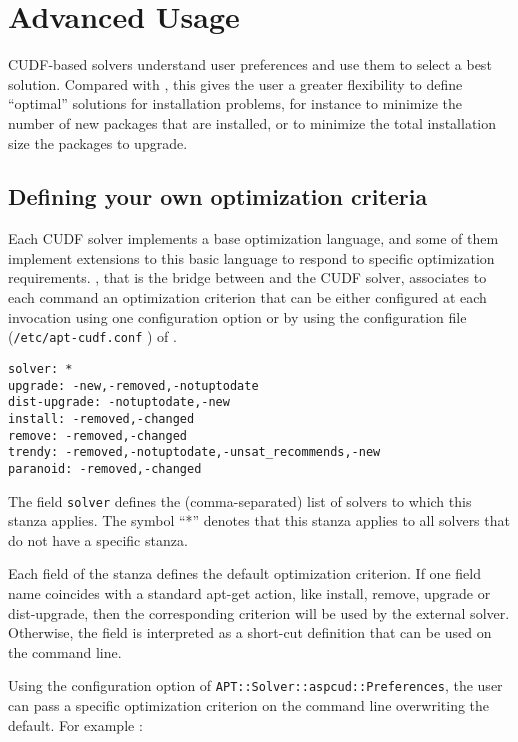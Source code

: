\section{Advanced Usage}

CUDF-based solvers understand user preferences and use them to select
a best solution. Compared with \aptget, this gives the user a greater
flexibility to define ``optimal'' solutions for installation problems,
for instance to minimize the number of new packages that are
installed, or to minimize the total installation size the packages to
upgrade.

\subsection{Defining your own optimization criteria}

Each CUDF solver implements a base optimization language, and some of
them implement extensions to this basic language to respond to
specific optimization requirements. \aptcudf, that is the bridge between
\aptget{} and the CUDF solver, associates to each \aptget{} command an
optimization criterion that can be either configured at each invocation
using one \aptget{} configuration option or by using the configuration
file (\texttt{/etc/apt-cudf.conf} ) of \aptcudf.

\begin{verbatim}
solver: *
upgrade: -new,-removed,-notuptodate
dist-upgrade: -notuptodate,-new
install: -removed,-changed
remove: -removed,-changed
trendy: -removed,-notuptodate,-unsat_recommends,-new
paranoid: -removed,-changed
\end{verbatim}

The field \texttt{solver} defines the (comma-separated) list of solvers
to which this stanza applies. The symbol ``*'' denotes that this
stanza applies to all solvers that do not have a specific stanza.

Each field of the stanza defines the default optimization criterion.
If one field name coincides with a standard apt-get action, like
install, remove, upgrade or dist-upgrade, then the corresponding
criterion will be used by the external solver. Otherwise, the field is
interpreted as a short-cut definition that can be used on the
\aptget{} command line.

Using the configuration option of \aptget{}
\texttt{APT::Solver::aspcud::Preferences}, the user can pass a
specific optimization criterion on the command line overwriting the
default. For example :

